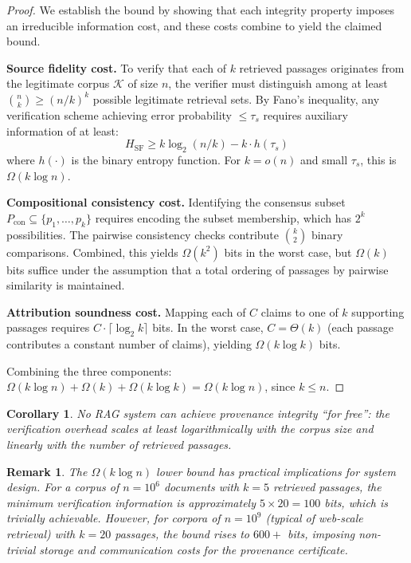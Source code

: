 \documentclass[journal,10pt]{IEEEtran}
\newtheorem{corollary}[theorem]{Corollary}
\newtheorem{remark}{Remark}
\newcommand{\calK}{\mathcal{K}}
\begin{document}
\begin{proof}
We establish the bound by showing that each integrity property imposes an irreducible information cost, and these costs combine to yield the claimed bound.

\textbf{Source fidelity cost.} To verify that each of $k$ retrieved passages originates from the legitimate corpus $\calK$ of size $n$, the verifier must distinguish among at least $\binom{n}{k} \geq (n/k)^k$ possible legitimate retrieval sets. By Fano's inequality, any verification scheme achieving error probability $\leq \tau_s$ requires auxiliary information of at least:
\begin{equation}\label{eq:fano}
H_{\text{SF}} \geq k \log_2(n/k) - k \cdot h(\tau_s)
\end{equation}
where $h(\cdot)$ is the binary entropy function. For $k = o(n)$ and small $\tau_s$, this is $\Omega(k \log n)$.

\textbf{Compositional consistency cost.} Identifying the consensus subset $P_{\text{con}} \subseteq \{p_1, \ldots, p_k\}$ requires encoding the subset membership, which has $2^k$ possibilities. The pairwise consistency checks contribute $\binom{k}{2}$ binary comparisons. Combined, this yields $\Omega(k^2)$ bits in the worst case, but $\Omega(k)$ bits suffice under the assumption that a total ordering of passages by pairwise similarity is maintained.

\textbf{Attribution soundness cost.} Mapping each of $C$ claims to one of $k$ supporting passages requires $C \cdot \lceil\log_2 k\rceil$ bits. In the worst case, $C = \Theta(k)$ (each passage contributes a constant number of claims), yielding $\Omega(k \log k)$ bits.

Combining the three components: $\Omega(k \log n) + \Omega(k) + \Omega(k \log k) = \Omega(k \log n)$, since $k \leq n$.
\end{proof}

\begin{corollary}\label{cor:nofree}
No RAG system can achieve provenance integrity ``for free'': the verification overhead scales at least logarithmically with the corpus size and linearly with the number of retrieved passages.
\end{corollary}

\begin{remark}
The $\Omega(k \log n)$ lower bound has practical implications for system design. For a corpus of $n = 10^6$ documents with $k = 5$ retrieved passages, the minimum verification information is approximately $5 \times 20 = 100$ bits, which is trivially achievable. However, for corpora of $n = 10^9$ (typical of web-scale retrieval) with $k = 20$ passages, the bound rises to $600+$ bits, imposing non-trivial storage and communication costs for the provenance certificate.
\end{remark}
\end{document}
